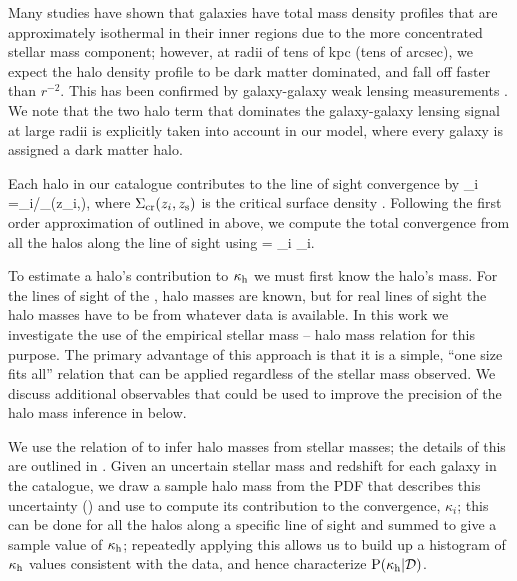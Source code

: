 \documentclass[useAMS,usenatbib,a4paper]{mn2e}
\begin{document}
Many studies have shown that galaxies have total mass density profiles that
are approximately isothermal in their inner regions
\citep[\eg][]{AugerEtal2010} due to the more concentrated stellar mass
component; however, at radii of tens of kpc (tens of arcsec), we expect the
halo density profile to be dark matter dominated, and fall off faster than
$r^{-2}$. This has been confirmed by galaxy-galaxy weak lensing measurements 
\citep[\eg][]{Mandelbaum,Leauthaud}. We note that the two halo term that
dominates the galaxy-galaxy lensing signal at large radii is explicitly taken
into account in our model, where every galaxy is assigned a dark matter halo.

Each halo in our catalogue contributes to
the line of sight convergence by
\be
\label{eq:kappai}
\kappa_i =\Sigma_{i}/\Sigma_{}(z_i,\zs),
\ee
where $\Sigma_{\mathrm{cr}}(z_i,z_{\rm s})$ is the critical surface density .
Following the first order approximation of \citet{HilbertEtal2009}
outlined in  above, we compute 
the total convergence from all the halos along the line
of sight using
\be 
\label{eq:kappasummu}
\kappah = \sum_{i} \kappa_i.
\ee

To estimate a halo's contribution to $\kappa_{\rm h}$ we must first know the
halo's mass. For the lines of sight of the \MS, halo masses are
known, but for  real lines of sight the halo masses have to be \infered
from whatever data is available. 
In this work we investigate the use of the empirical stellar mass --
halo mass relation for this purpose. The primary advantage of this
approach is that it is a simple, ``one size fits all'' relation that can
be applied regardless of the stellar mass observed. We discuss
additional observables that could be used to improve the precision of
the halo mass inference in  below. 

We use the relation of \citet{BehrooziEtal2010} to infer halo masses
from stellar masses; the details of this \proceedure are outlined in 
. Given an uncertain stellar mass and redshift for
each galaxy in the  catalogue, we draw a sample halo mass from the PDF
that describes this uncertainty () and use
 to compute its contribution to the convergence,
$\kappa_i$; this can be done for all the halos along a specific line of sight
and summed to give a sample value of $\kappa_{\rm h}$;  repeatedly applying
this \proceedure allows us to build up a histogram of $\kappa_{\rm h}$ values
consistent with the data, and hence characterize ${\rm P}(\kappa_{\rm h}|{\mathcal{D}})$. 
\end{document}
